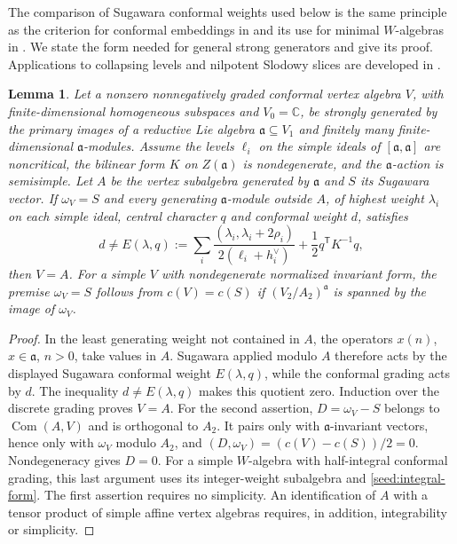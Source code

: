 \documentclass[11pt,a4paper]{amsart}
\numberwithin{equation}{section}
\newtheorem{lemma}[theorem]{Lemma}
\theoremstyle{definition}
\theoremstyle{remark}
\newcommand{\C}{\mathbb C}
\newcommand{\Com}{\operatorname{Com}}
\begin{document}
The comparison of Sugawara conformal weights used below is the same
principle as the criterion for conformal embeddings in
\cite[Theorem~2.2]{APConformal2013} and its use for minimal
$W$-algebras in \cite[Section~4]{AdamovicEtAl2018}. We state the form
needed for general strong generators and give its proof. Applications
to collapsing levels and nilpotent Slodowy slices are developed in
\cite{AKMPP2020,AVEMSlodowy2024}.

\begin{lemma}\label{v3:resonance}
Let a nonzero nonnegatively graded conformal vertex algebra $V$, with finite-dimensional
homogeneous subspaces and $V_0=\C$, be strongly generated by the primary images
of a reductive Lie algebra $\mathfrak a\subseteq V_1$ and finitely
many finite-dimensional $\mathfrak a$-modules. Assume the levels
$\ell_i$ on the simple ideals of $[\mathfrak a,\mathfrak a]$ are
noncritical, the bilinear form $K$ on $Z(\mathfrak a)$ is
nondegenerate, and the $\mathfrak a$-action is semisimple.
Let $A$ be the vertex subalgebra generated by $\mathfrak a$ and
$S$ its Sugawara vector. If $\omega_V=S$ and every generating
$\mathfrak a$-module outside $A$, of highest weight $\lambda_i$
on each simple ideal, central character $q$ and conformal weight $d$, satisfies
$$
 d\ne E(\lambda,q):=
 \sum_i\frac{(\lambda_i,\lambda_i+2\rho_i)}{2(\ell_i+h_i^\vee)}
                      +\frac12q^{\mathsf T}K^{-1}q,
$$
then $V=A$. For a simple $V$ with nondegenerate normalized invariant
form, the premise $\omega_V=S$ follows from $c(V)=c(S)$ if
$(V_2/A_2)^{\mathfrak a}$ is spanned by the image of $\omega_V$.
\end{lemma}
\begin{proof}
In the least generating weight not contained in $A$, the operators
$x(n)$, $x\in\mathfrak a$, $n>0$, take values in $A$. Sugawara applied modulo $A$ therefore acts by the displayed
Sugawara conformal weight $E(\lambda,q)$, while the conformal grading acts by $d$.
The inequality $d\ne E(\lambda,q)$ makes this quotient zero.
Induction over the discrete grading proves $V=A$.
For the second assertion, $D=\omega_V-S$ belongs to $\Com(A,V)$ and
is orthogonal to $A_2$. It pairs only with $\mathfrak a$-invariant vectors, hence
only with $\omega_V$ modulo $A_2$, and
$(D,\omega_V)=(c(V)-c(S))/2=0$. Nondegeneracy gives $D=0$.
For a simple $W$-algebra with half-integral conformal grading, this last
argument uses its integer-weight subalgebra and \cref{seed:integral-form}.
The first assertion
requires no simplicity. An identification of $A$ with a tensor product of simple affine vertex
algebras requires, in addition, integrability or simplicity.
\end{proof}
\end{document}

